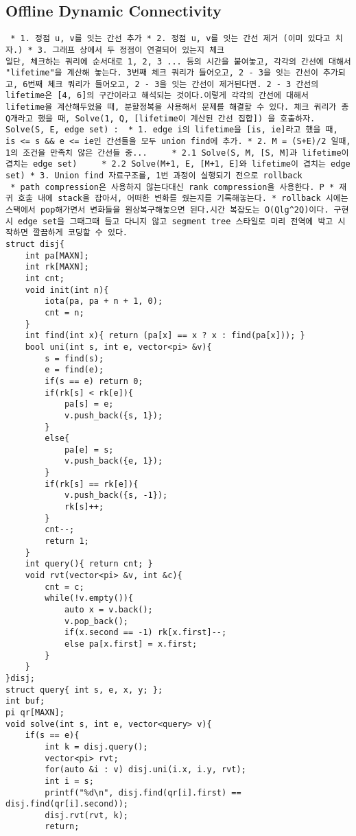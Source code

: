 \documentclass[landscape, 8pt, a4paper, oneside, twocolumn]{extarticle}
\begin{document}
\subsection {Offline Dynamic Connectivity}
\begin{verbatim}
 * 1. 정점 u, v를 잇는 간선 추가 * 2. 정점 u, v를 잇는 간선 제거 (이미 있다고 치자.) * 3. 그래프 상에서 두 정점이 연결되어 있는지 체크
일단, 체크하는 쿼리에 순서대로 1, 2, 3 ... 등의 시간을 붙여놓고, 각각의 간선에 대해서 "lifetime"을 계산해 놓는다. 3번째 체크 쿼리가 들어오고, 2 - 3을 잇는 간선이 추가되고, 6번째 체크 쿼리가 들어오고, 2 - 3을 잇는 간선이 제거된다면. 2 - 3 간선의 lifetime은 [4, 6]의 구간이라고 해석되는 것이다.이렇게 각각의 간선에 대해서 lifetime을 계산해두었을 때, 분할정복을 사용해서 문제를 해결할 수 있다. 체크 쿼리가 총 Q개라고 했을 때, Solve(1, Q, [lifetime이 계산된 간선 집합]) 을 호출하자. Solve(S, E, edge set) :  * 1. edge i의 lifetime을 [is, ie]라고 했을 때, is <= s && e <= ie인 간선들을 모두 union find에 추가. * 2. M = (S+E)/2 일때, 1의 조건을 만족치 않은 간선들 중...     * 2.1 Solve(S, M, [S, M]과 lifetime이 겹치는 edge set)     * 2.2 Solve(M+1, E, [M+1, E]와 lifetime이 겹치는 edge set) * 3. Union find 자료구조를, 1번 과정이 실행되기 전으로 rollback
 * path compression은 사용하지 않는다대신 rank compression을 사용한다. P * 재귀 호출 내에 stack을 잡아서, 어떠한 변화를 줬는지를 기록해놓는다. * rollback 시에는 스택에서 pop해가면서 변화들을 원상복구해놓으면 된다.시간 복잡도는 O(Qlg^2Q)이다. 구현 시 edge set을 그때그때 들고 다니지 않고 segment tree 스타일로 미리 전역에 박고 시작하면 깔끔하게 코딩할 수 있다. 
struct disj{
	int pa[MAXN];
	int rk[MAXN];
	int cnt;
	void init(int n){
		iota(pa, pa + n + 1, 0);
		cnt = n;
	}
	int find(int x){ return (pa[x] == x ? x : find(pa[x])); }
	bool uni(int s, int e, vector<pi> &v){
		s = find(s);
		e = find(e);
		if(s == e) return 0;
		if(rk[s] < rk[e]){
			pa[s] = e;
			v.push_back({s, 1});
		}
		else{
			pa[e] = s;
			v.push_back({e, 1});	
		}
		if(rk[s] == rk[e]){
			v.push_back({s, -1});
			rk[s]++;
		}
		cnt--;
		return 1;
	}
	int query(){ return cnt; }
	void rvt(vector<pi> &v, int &c){
		cnt = c;
		while(!v.empty()){
			auto x = v.back();
			v.pop_back();
			if(x.second == -1) rk[x.first]--;
			else pa[x.first] = x.first;
		}
	}
}disj;
struct query{ int s, e, x, y; };
int buf;
pi qr[MAXN];
void solve(int s, int e, vector<query> v){
	if(s == e){
		int k = disj.query();
		vector<pi> rvt;
		for(auto &i : v) disj.uni(i.x, i.y, rvt);
        int i = s;
		printf("%d\n", disj.find(qr[i].first) == disj.find(qr[i].second));
		disj.rvt(rvt, k);
		return;

\end{verbatim}
\end{document}
